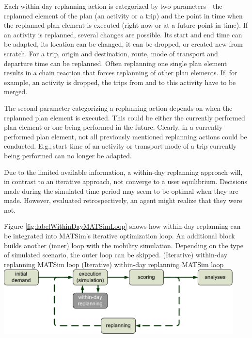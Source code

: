 Each within-day replanning action is categorized by two parameters---the replanned element of the plan (an activity or a trip) and the point in time when the replanned plan element is executed (right now or at a future point in time). If an activity is replanned, several changes are possible. Its start and end time can be adapted, its location can be changed, it can be dropped, or created new from scratch. For a trip, origin and destination, route, mode of transport and departure time can be replanned. Often replanning one single plan element results in a chain reaction that forces replanning of other plan elements. If, for example, an activity is dropped, the trips from and to this activity have to be merged.

The second parameter categorizing a replanning action depends on when the replanned plan element is executed. This could be either the currently performed plan element or one being performed in the future. Clearly, in a currently performed plan element, not all previously mentioned replanning actions could be conducted. E.g.,\,start time of an activity or transport mode of a trip currently being performed can no longer be adapted.

Due to the limited available information, a within-day replanning approach will, in contrast to an iterative approach, not converge to a user equilibrium. Decisions made during the simulated time period may seem to be optimal when they are made. However, evaluated retrospectively, an agent might realize that they were not.

Figure \ref{fig:labelWithinDayMATSimLoop} shows how within-day replanning can be integrated into MATSim's iterative optimization loop. An additional block builds another (inner) loop with the mobility simulation. Depending on the type of simulated scenario, the outer loop can be skipped.
\createfigure%
{(Iterative) within-day replanning MATSim loop}%
{(Iterative) within-day replanning MATSim loop}%
{\label{fig:labelWithinDayMATSimLoop}}%
{\includegraphics[width=12.5cm, angle=0]{extending/figures/WithinDayReplanning/WithinDayMATSimLoop}}%
{}%

